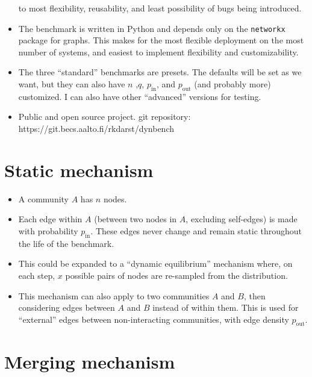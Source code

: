 \documentclass{article}
\def\pin{p_\mathrm{in}}
\def\pout{p_\mathrm{out}}
\begin{document}
\begin{itemize}
  to most flexibility, reusability, and least possibility of bugs being introduced.
\item The benchmark is written in Python and depends only on the
  \texttt{networkx} package for graphs.  This makes for the most
  flexible deployment on the most number of systems, and easiest to
  implement flexibility and customizability.
\item The three ``standard'' benchmarks are presets.  The defaults
  will be set as we want, but they can also have $n$ ,$q$, $\pin$,
  and $\pout$ (and probably more) customized.  I can also have other
  ``advanced'' versions
  for testing.
\item Public and open source project.  git repository:
  https://git.becs.aalto.fi/rkdarst/dynbench
\end{itemize}



\section{Static mechanism}
\begin{itemize}
\item A community $A$ has $n$ nodes.
\item Each edge within $A$ (between two nodes in $A$, excluding
  self-edges) is made with probability $\pin$.  These edges never
  change and remain static throughout the life of the benchmark.
\item This could be expanded to a ``dynamic equilibrium'' mechanism
  where, on each step, $x$ possible pairs of nodes are re-sampled from
  the distribution.
\item This mechanism can also apply to two communities $A$ and $B$,
  then considering edges between $A$ and $B$ instead of within them.
  This is used for ``external'' edges between non-interacting
  communities, with edge density $\pout$.
\end{itemize}



\section{Merging mechanism}
\end{document}
